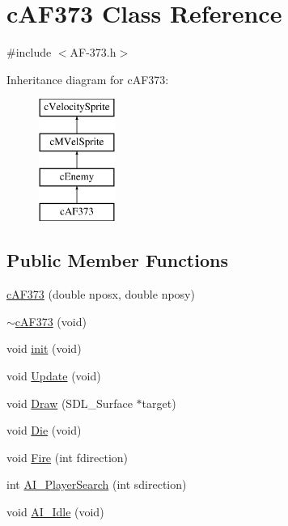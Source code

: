 \hypertarget{classc_a_f373}{\section{c\-A\-F373 Class Reference}
\label{classc_a_f373}
}


{\ttfamily \#include $<$A\-F-\/373.\-h$>$}

Inheritance diagram for c\-A\-F373\-:\begin{figure}[H]
\begin{center}
\leavevmode
\includegraphics[height=4.000000cm]{classc_a_f373}
\end{center}
\end{figure}
\subsection*{Public Member Functions}
\begin{DoxyCompactItemize}
\item 
\hyperlink{classc_a_f373_ad1e010b3a5e419ad7d408667529e1c66}{c\-A\-F373} (double nposx, double nposy)
\item 
\hyperlink{classc_a_f373_a3c8a190ad1d09df42a02121023afd0f4}{$\sim$c\-A\-F373} (void)
\item 
void \hyperlink{classc_a_f373_af45007e3095690f46e0b741650b3829c}{init} (void)
\item 
void \hyperlink{classc_a_f373_acbc4a7495a52eeeac9f25fd09b390173}{Update} (void)
\item 
void \hyperlink{classc_a_f373_afecf71a620a3a1a0cd65c298527e574c}{Draw} (S\-D\-L\-\_\-\-Surface $\ast$target)
\item 
void \hyperlink{classc_a_f373_a246b6884baae7e13033749f1aa456dc9}{Die} (void)
\item 
void \hyperlink{classc_a_f373_af50876922f41b71690754973792fd5fe}{Fire} (int fdirection)
\item 
int \hyperlink{classc_a_f373_a2600986414d9d5e46fa3705064a49965}{A\-I\-\_\-\-Player\-Search} (int sdirection)
\item 
void \hyperlink{classc_a_f373_ad0fb3ef25506c23d026826847b663453}{A\-I\-\_\-\-Idle} (void)
\end{DoxyCompactItemize}
